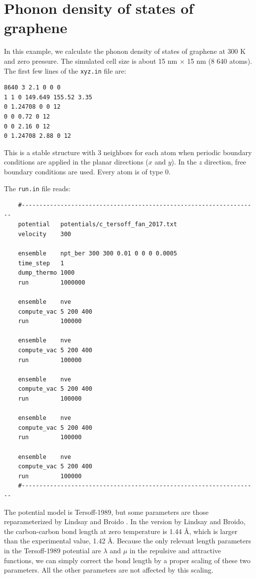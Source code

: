 \documentclass[12pt,a4paper]{report}
\begin{document}
\section{Phonon density of states of graphene}


In this example, we calculate the phonon density of states of graphene at 300 K
and zero pressure. The simulated cell size is about 15 nm $\times$ 15 nm (8 640 atoms).
The first few lines of the \verb"xyz.in" file are:
\begin{verbatim}
8640 3 2.1 0 0 0
1 1 0 149.649 155.52 3.35
0 1.24708 0 0 12
0 0 0.72 0 12
0 0 2.16 0 12
0 1.24708 2.88 0 12
\end{verbatim}
This is a stable structure with 3 neighbors for each atom when periodic boundary conditions are applied in the planar directions ($x$ and $y$). In the $z$ direction, free boundary conditions are used. Every atom is of type 0.

The \verb"run.in" file reads:
\begin{verbatim}
    #-------------------------------------------------------------------
    potential   potentials/c_tersoff_fan_2017.txt
    velocity    300

    ensemble    npt_ber 300 300 0.01 0 0 0 0.0005
    time_step   1
    dump_thermo 1000
    run         1000000

    ensemble    nve
    compute_vac 5 200 400
    run         100000

    ensemble    nve
    compute_vac 5 200 400
    run         100000

    ensemble    nve
    compute_vac 5 200 400
    run         100000

    ensemble    nve
    compute_vac 5 200 400
    run         100000

    ensemble    nve
    compute_vac 5 200 400
    run         100000
    #-------------------------------------------------------------------
\end{verbatim}

The potential model is Tersoff-1989, but some parameters are those reparameterized by Lindsay and Broido \cite{lindsay2010prb}. In the version by Lindsay and Broido, the carbon-carbon bond length at zero temperature is 1.44 \AA, which is larger than the experimental value, 1.42 \AA. Because the only relevant length parameters in the Tersoff-1989 potential are $\lambda$ and $\mu$ in the repulsive and attractive functions, we can simply correct the bond length by a proper scaling of these two parameters. All the other parameters are not affected by this scaling.
\end{document}
